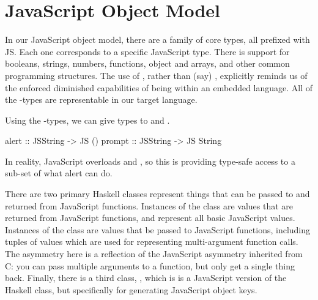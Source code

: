  
\section{JavaScript Object Model}
\label{sec:object-model}

In our JavaScript object model, there are a family of core types, all prefixed with JS.
Each one corresponds to a specific JavaScript type.
There is support for booleans, strings, numbers, functions,
object and arrays, and other common programming structures.
The use of , rather than (say) ,
explicitly reminds us of the enforced diminished capabilities of
being within an embedded language.
All of the -types are representable in our target language.

Using the -types, we can give types to  and .
\begin{Code}
alert :: JSString -> JS ()
prompt :: JSString -> JS String
\end{Code}
In reality, JavaScript overloads  and ,
so this is providing type-safe access to a sub-set of what
alert can do.

There are two primary Haskell classes represent things that can
be passed to and returned from JavaScript functions.
Instances of the  class 
are values that are returned from JavaScript functions,
and represent all basic JavaScript values.
Instances of the  class
are values that be passed to JavaScript functions,
including tuples of values which are used for representing multi-argument 
function calls.
The asymmetry here is a reflection of the JavaScript
asymmetry inherited from C: you can pass multiple arguments
to a function, but only get a single thing back.
Finally, there is a third class, , which is
is a JavaScript version of the Haskell  class,
but specifically for generating JavaScript object keys.



